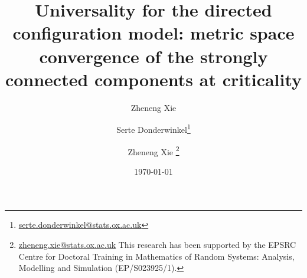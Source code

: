\documentclass[notitlepage,11pt, a4paper]{article}
\title{Universality for the directed configuration model: metric space convergence of the strongly connected components at criticality}
\author{ \and Zheneng Xie}
\author{Serte Donderwinkel\thanks{\href{mailto:serte.donderwinkel@stats.ox.ac.uk}{serte.donderwinkel@stats.ox.ac.uk}} \and Zheneng Xie \thanks{\href{zheneng.xie@stats.ox.ac.uk}{zheneng.xie@stats.ox.ac.uk} This research has been supported by the EPSRC Centre for Doctoral Training in Mathematics of Random Systems: Analysis, Modelling and Simulation (EP/S023925/1).}}
\date{\today}
\begin{document}
\maketitle










\newpage 

\begin{appendices}
%


\end{appendices}



\end{document}
